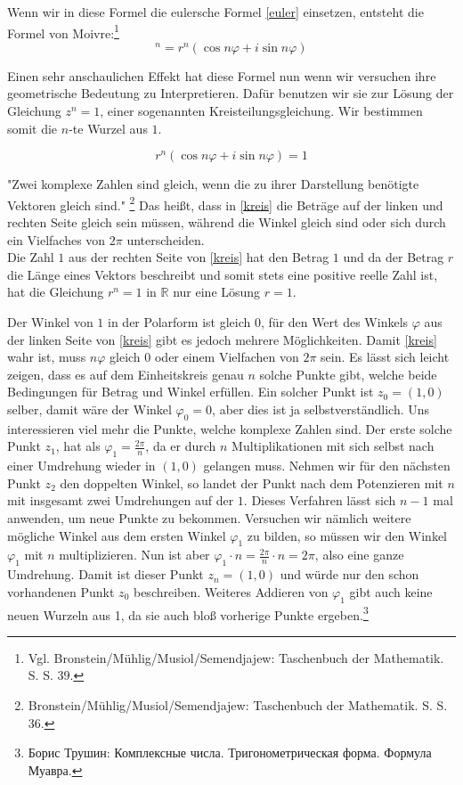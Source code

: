 \documentclass[a4paper,12pt]{article} %
\begin{document}
Wenn wir in diese Formel die eulersche Formel \eqref{euler} einsetzen, entsteht die Formel von Moivre:\footnote{Vgl. Bronstein/Mühlig/Musiol/Semendjajew: Taschenbuch der Mathematik. S. S. $39$.}
\begin{equation}
	[r(\cos\varphi+i\sin\varphi)]^n=r^n(\cos n\varphi+i\sin n\varphi)
\end{equation}

Einen sehr anschaulichen Effekt hat diese Formel nun wenn wir versuchen ihre geometrische Bedeutung zu Interpretieren.
Dafür benutzen wir sie zur Lösung der Gleichung $z^n=1$, einer sogenannten Kreisteilungsgleichung.
Wir bestimmen somit die $n$-te Wurzel aus $1$.

\begin{equation}\label{kreis}
	r^n(\cos n\varphi+i\sin n\varphi)=1
\end{equation}

"{}Zwei komplexe Zahlen sind gleich, wenn die zu ihrer Darstellung benötigte Vektoren gleich sind."
\footnote{Bronstein/Mühlig/Musiol/Semendjajew: Taschenbuch der Mathematik. S. S. $36$.}
Das heißt, dass in \eqref{kreis} die Beträge auf der linken und rechten Seite gleich sein müssen, während die Winkel gleich sind oder sich durch ein Vielfaches von $2\pi$ unterscheiden.\\


Die Zahl $1$ aus der rechten Seite von \eqref{kreis} hat den Betrag $1$ und da der Betrag $r$ die Länge eines Vektors beschreibt und somit stets eine positive reelle Zahl ist, hat die Gleichung $r^n=1$ in $\mathbb{R}$ nur eine Lösung $r=1$.

Der Winkel von $1$ in der Polarform ist gleich $0$, für den Wert des Winkels $\varphi$ aus der linken Seite von \eqref{kreis} gibt es jedoch mehrere Möglichkeiten.
Damit \eqref{kreis} wahr ist, muss $n\varphi$ gleich $0$ oder einem Vielfachen von $2\pi$ sein.
Es lässt sich leicht zeigen, dass es auf dem Einheitskreis genau $n$ solche Punkte gibt, welche beide Bedingungen für Betrag und Winkel erfüllen.
Ein solcher Punkt ist $z_0=(1,0)$ selber, damit wäre der Winkel $\varphi_0=0$, aber dies ist ja selbstverständlich.
Uns interessieren viel mehr die Punkte, welche komplexe Zahlen sind.
Der erste solche Punkt $z_1$, hat als $\varphi_1=\frac{2\pi}{n}$, da er durch $n$ Multiplikationen mit sich selbst nach einer Umdrehung wieder in $(1, 0)$ gelangen muss.
Nehmen wir für den nächsten Punkt $z_2$ den doppelten Winkel, so landet der Punkt nach dem Potenzieren mit $n$ mit insgesamt zwei Umdrehungen auf der $1$.
Dieses Verfahren lässt sich $n-1$ mal anwenden, um neue Punkte zu bekommen.
Versuchen wir nämlich weitere mögliche Winkel aus dem ersten Winkel $\varphi_1$ zu bilden, so müssen wir den Winkel $\varphi_1$ mit $n$ multiplizieren.
Nun ist aber $\varphi_1 \cdot n =\frac{2\pi}{n}\cdot n = 2\pi$, also eine ganze Umdrehung.
Damit ist dieser Punkt $z_n=(1,0)$ und würde nur den schon vorhandenen Punkt $z_0$ beschreiben.
Weiteres Addieren von $\varphi_1$ gibt auch keine neuen Wurzeln aus 1, da sie auch bloß vorherige Punkte ergeben.\footnote{Борис Трушин: Комплексные числа. Тригонометрическая форма. Формула Муавра.}
\\
\end{document}
